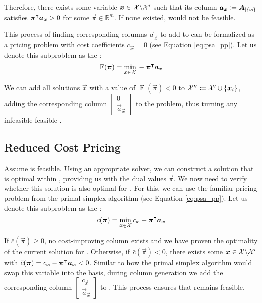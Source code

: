 Therefore, there exists some variable ${\bm{x}} \in \mathcal{X} \backslash \mathcal{X}'$ such that its column ${\bm{a}}_{\bm{x}} \coloneqq {\bm{A}}_{\vert \{{\bm{x}}\}}$ satisfies ${\bm{\pi}}^\intercal {\bm{a}}_{\bm{x}} > 0$ for some $\vec{\pi} \in \mathbb{R}^m$. If none existed, \MP{} would not be feasible.

This process of finding corresponding columns $\vec{a}_\vec{x}$ to add to \RMP{} can be formalized as a pricing problem with cost coefficients $c_\vec{x} = 0$ (see Equation \eqref{eq:psa_pp}). Let us denote this subproblem as the \FP{}:
\begin{equation}
\operatorname{F}({\bm{\pi}}) = \underset{x \in \mathcal{X}}{\min} \, -{\bm{\pi}}^\intercal {\bm{a}}_x
\end{equation}

We can add all solutions $\vec{x}$ with a value of $\operatorname{F}(\vec{\pi}) < 0$ to $\mathcal{X}'' \coloneqq \mathcal{X}' \cup \{{\bm{x}}_i\}$, adding the corresponding column $\begin{bmatrix}0 \\ \vec{a}_\vec{x} \end{bmatrix}$ to the problem, thus turning any infeasible \RMP{} feasible \cite{thebook}.

\subsection{Reduced Cost Pricing \RCP{}}\label{sec:cg_bp_cg_reduced}
Assume \RMP{} is feasible. Using an appropriate solver, we can construct a solution that is optimal within \RMP{}, providing us with the dual values $\vec{\pi}$. We now need to verify whether this solution is also optimal for \MP{}. For this, we can use the familiar pricing problem from the primal simplex algorithm (see Equation \eqref{eq:psa_pp}). Let us denote this subproblem as the \RCP{}:
\begin{equation}
\bar{c}(\vec{\pi}) = \underset{\vec{x} \in \indexset{X}}{\min} \, c_\vec{x} - \vec{\pi}\transpose \vec{a}_\vec{x}
\end{equation}

If $\bar{c}(\vec{\pi}) \geq 0$, no cost-improving column exists and we have proven the optimality of the current solution for \MP{}. Otherwise, if $\bar{c}(\vec{\pi}) < 0$, there exists some ${\bm{x}} \in \mathcal{X} \backslash \mathcal{X}'$ with $\bar{c}(\vec{\pi}) = c_\vec{x} - \vec{\pi}\transpose \vec{a}_\vec{x} < 0$. Similar to how the primal simplex algorithm would swap this variable into the basis, during column generation we add the corresponding column $\begin{bmatrix} c_\vec{x} \\ \vec{a}_\vec{x} \end{bmatrix}$ to \RMP{} \cite{thebook}. This process ensures that \RMP{} remains feasible.

